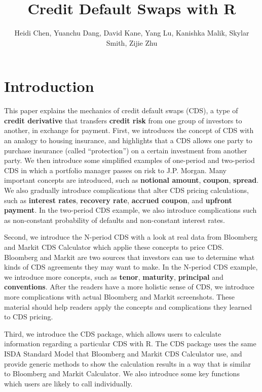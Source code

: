 \documentclass[article]{jss}
\author{
Heidi Chen,
Yuanchu Dang, 
David Kane, 
Yang Lu, 
Kanishka Malik, 
Skylar Smith,
Zijie Zhu}
\title{Credit Default Swaps with R}
\begin{document}

\section{Introduction}
\label{sec:Introduction}


  This paper explains the mechanics of credit default swaps (CDS), a type of \textbf{credit derivative} that transfers \textbf{credit risk} from one group of investors to another, in exchange for payment. First, we introduces the concept of CDS with an analogy to housing insurance, and highlights that a CDS allows one party to purchase insurance (called ``protection'') on a certain investment from another party. We then introduce some simplified examples of one-period and two-period CDS in which a portfolio manager passes on risk to J.P. Morgan. Many important concepts are introduced, such as \textbf{notional amount}, \textbf{coupon}, \textbf{spread}. We also gradually introduce complications that alter CDS pricing calculations, such as \textbf{interest rates}, \textbf{recovery rate}, \textbf{accrued coupon}, and \textbf{upfront payment}. In the two-period CDS example, we also introduce complications such as non-constant probability of defaults and non-constant interest rates.

Second, we introduce the N-period CDS with a look at real data from Bloomberg and Markit CDS Calculator which applie these concepts to price CDS. Bloomberg and Markit are two sources that investors can use to determine what kinds of CDS agreements they may want to make. In the N-period CDS example, we introduce more concepts, such as \textbf{tenor}, \textbf{maturity}, \textbf{principal} and \textbf{conventions}. After the readers have a more holistic sense of CDS, we introduce more complications with actual Bloomberg and Markit screenshots. These material should help readers apply the concepts and complications they learned to CDS pricing.

Third, we introduce the CDS package, which allows users to calculate information regarding a particular CDS with R. The CDS package uses the same ISDA Standard Model that Bloomberg and Markit CDS Calculator use, and provide generic methods to show the calculation results in a way that is similar to Bloomberg and Markit Calculator. We also introduce some key functions which users are likely to call individually.
\end{document}
